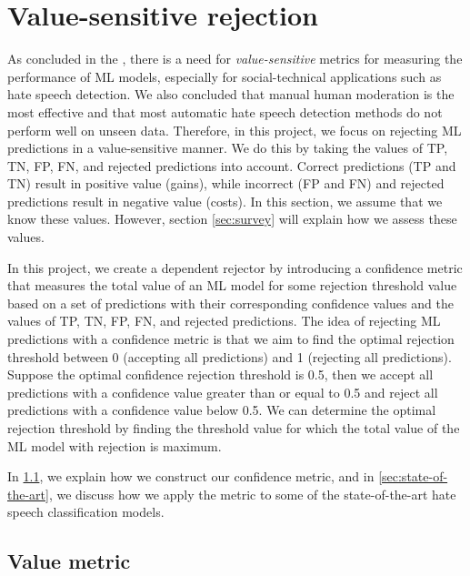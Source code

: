 \chapter{Value-sensitive rejection}
As concluded in the , there is a need for \textit{value-sensitive} metrics for measuring the performance of ML models, especially for social-technical applications such as hate speech detection.
%
We also concluded that manual human moderation is the most effective and that most automatic hate speech detection methods do not perform well on unseen data.
%
Therefore, in this project, we focus on rejecting ML predictions in a value-sensitive manner.
%
We do this by taking the values of TP, TN, FP, FN, and rejected predictions into account.
%
Correct predictions (TP and TN) result in positive value (gains), while incorrect (FP and FN) and rejected predictions result in negative value (costs).
%
In this section, we assume that we know these values.
%
However, section \ref{sec:survey} will explain how we assess these values.
%

%
In this project, we create a dependent rejector by introducing a confidence metric that measures the total value of an ML model for some rejection threshold value based on a set of predictions with their corresponding confidence values and the values of TP, TN, FP, FN, and rejected predictions.
%
The idea of rejecting ML predictions with a confidence metric is that we aim to find the optimal rejection threshold between 0 (accepting all predictions) and 1 (rejecting all predictions).
%
Suppose the optimal confidence rejection threshold is 0.5, then we accept all predictions with a confidence value greater than or equal to 0.5 and reject all predictions with a confidence value below 0.5.
%
We can determine the optimal rejection threshold by finding the threshold value for which the total value of the ML model with rejection is maximum.
%

%
In \ref{sec:value-metric}, we explain how we construct our confidence metric, and in \ref{sec:state-of-the-art}, we discuss how we apply the metric to some of the state-of-the-art hate speech classification models.

\section{Value metric}
\label{sec:value-metric}

